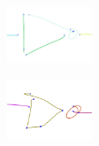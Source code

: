 \documentclass[10pt]{acmsiggraph}               %
\begin{document}
\begin{figure}[h]
\centering
\includegraphics[width=1.0in]{missegmentedgate2.png}
\label{fig:connections}
\end{figure}

\begin{figure}[h]
\centering
\includegraphics[width=1.0in]{missegmentedgate3.png}
\label{fig:connections}
\end{figure}


\nocite{*}

\end{document}
